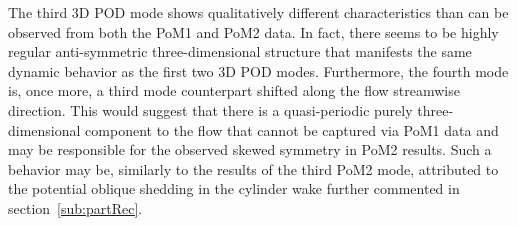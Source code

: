 {{{The third 3D POD mode shows qualitatively different characteristics than can be observed from both the PoM1 and PoM2 data. In fact, there seems to be highly regular anti-symmetric three-dimensional structure that manifests the same dynamic behavior as the first two 3D POD modes. Furthermore, the fourth mode is, once more, a third mode counterpart shifted along the flow streamwise direction. This would suggest that there is a quasi-periodic purely three-dimensional component to the flow that cannot be captured via PoM1 data and may be responsible for the observed skewed symmetry in PoM2 results. Such a behavior may be, similarly to the results of the third PoM2 mode, attributed to the potential oblique shedding in the cylinder wake further commented in section~\ref{sub:partRec}.}



}}
